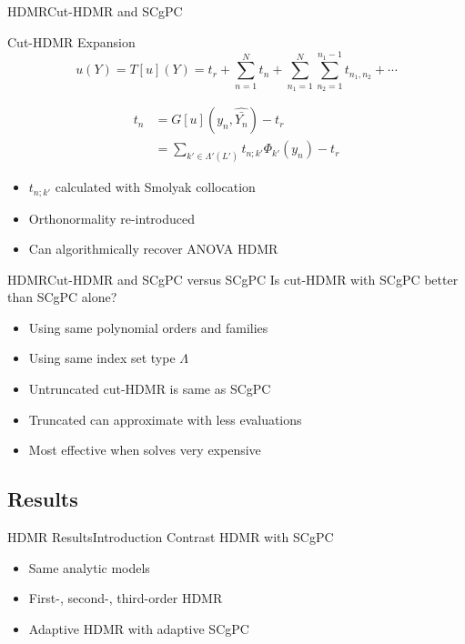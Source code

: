 \documentclass{beamer}
\begin{document}
\begin{frame}{HDMR}{Cut-HDMR and SCgPC}
  \begin{block}{Cut-HDMR Expansion}
    \[u(Y) = T[u](Y) = t_r + \sum_{n=1}^N t_n + \sum_{n_1=1}^N\sum_{n_2=1}^{n_1-1} t_{n_1,n_2}+\cdots\]
  \end{block}\vspace{-20pt}
  \begin{align*}
    t_n &= G[u](y_n,\hat{\bar{Y_n}}) - t_r \\
    &= \sum_{k'\in\Lambda'(L')} t_{n;k'}\Phi_{k'}(y_n) - t_r
  \end{align*}
  \begin{itemize}
    \item $t_{n;k'}$ calculated with Smolyak collocation
    \item Orthonormality re-introduced
    \item Can algorithmically recover ANOVA HDMR
  \end{itemize}
\end{frame}

\begin{frame}{HDMR}{Cut-HDMR and SCgPC versus SCgPC}
  \vfill
  Is cut-HDMR with SCgPC better than SCgPC alone?
  \vfill
  \begin{itemize}
    \item Using same polynomial orders and families
  \vfill
    \item Using same index set type $\Lambda$
  \vfill
    \item Untruncated cut-HDMR is same as SCgPC
  \vfill
    \item Truncated can approximate with less evaluations
  \vfill
    \item Most effective when solves very expensive
  \end{itemize}
  \vfill
\end{frame}

\subsection{Results}
\begin{frame}{HDMR Results}{Introduction}\vspace{-20pt}
  \vfill
  Contrast HDMR with SCgPC
  \vfill
  \begin{itemize}
    \item Same analytic models
  \vfill
    \item First-, second-, third-order HDMR
  \vfill
    \item Adaptive HDMR with adaptive SCgPC
  \end{itemize}
  \vfill
\end{frame}
\end{document}

